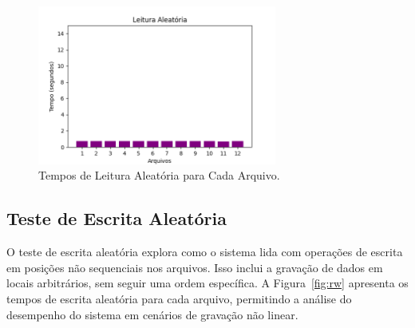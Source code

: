 \documentclass[
	12pt,				%
	openright,			%
	oneside,			%
	a4paper,			%
	chapter=TITLE,		%
	english,			%
	french,				%
	spanish,			%
	brazil				%
	]{abntex2}
\theoremstyle{definition}
\begin{document}
\begin{figure}[H]
    \centering
    \includegraphics[width=0.7\textwidth]{RandomRead.png}
    \caption{Tempos de Leitura Aleatória para Cada Arquivo.}
    \label{fig:rr}
\end{figure}


\subsection{Teste de Escrita Aleatória}

O teste de escrita aleatória explora como o sistema lida com operações de 
escrita em posições não sequenciais nos arquivos. Isso inclui a gravação 
de dados em locais arbitrários, sem seguir uma ordem específica. 
A Figura~\ref{fig:rw} apresenta os tempos de escrita aleatória para cada arquivo, 
permitindo a análise do desempenho do sistema em cenários de gravação não linear.
\end{document}
